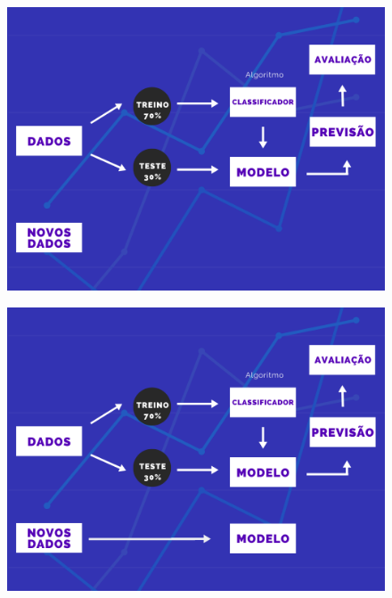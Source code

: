 \documentclass[compress]{beamer}
\begin{document}
\begin{frame}{}
    \begin{figure}
        \centering
        \includegraphics[scale=.39]{img/9.png}
    \end{figure}
\end{frame}
\begin{frame}{}
    \begin{figure}
        \centering
        \includegraphics[scale=.39]{img/10.png}
    \end{figure}
\end{frame}
\end{document}
